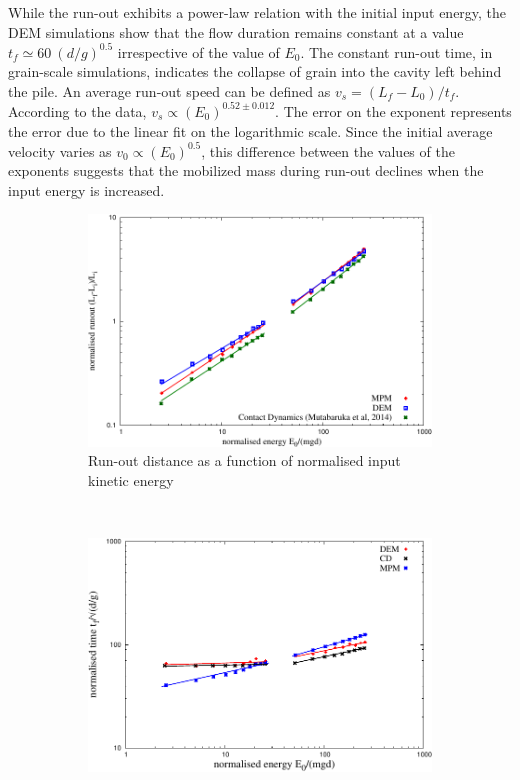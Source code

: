 While the run-out exhibits a power-law relation with the initial input energy, 
the DEM simulations show that the flow duration remains constant at a value  
$t_f \simeq 60 \  (d/g)^{0.5}$ irrespective of the value of $E_0$. The constant 
run-out time, in grain-scale simulations, indicates the collapse of grain into 
the cavity left behind the pile. An average run-out speed can be defined as 
$v_s = (L_f - L_0) / t_f$. According to the data, $v_s \propto 
(E_0)^{0.52\pm 0.012}$. The error on the exponent represents the 
error due to the linear fit on the logarithmic scale. Since the initial 
average velocity varies as $v_0 \propto (E_0)^{0.5}$, this difference between 
the values of the exponents suggests that the mobilized mass during run-out 
declines when the input energy is increased.


\begin{figure}[tbph]
\centering
\begin{subfigure}[b]{0.975\textwidth}
\centering
\includegraphics[width=\textwidth]{Runout_Eo_MPM_CD_DEM}
\caption{Run-out distance as a function of normalised input kinetic energy}
\label{fig:Runout_Eo_MPM_CD_DEM}
\end{subfigure}
\\
\begin{subfigure}[b]{0.975\textwidth}
\centering
\includegraphics[width=\textwidth]{Tf_vs_Eo_Slope}

\end{subfigure}
\end{figure}
